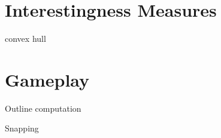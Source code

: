 \section{Interestingness Measures}
\label{interesting}
convex hull

\section{Gameplay}
Outline computation \label{outline}

Snapping
